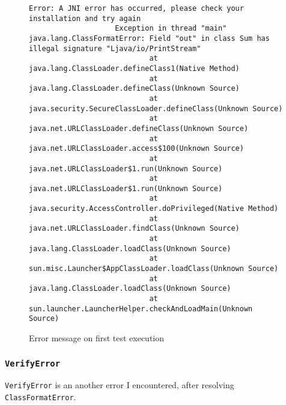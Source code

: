 \documentclass[a4paper, 12pt]{article}
\begin{document}
            \begin{figure}[H]
                \begin{lstlisting}[gobble=20]
                    Error: A JNI error has occurred, please check your installation and try again
                    Exception in thread "main" java.lang.ClassFormatError: Field "out" in class Sum has illegal signature "Ljava/io/PrintStream"
                            at java.lang.ClassLoader.defineClass1(Native Method)
                            at java.lang.ClassLoader.defineClass(Unknown Source)
                            at java.security.SecureClassLoader.defineClass(Unknown Source)
                            at java.net.URLClassLoader.defineClass(Unknown Source)
                            at java.net.URLClassLoader.access$100(Unknown Source)
                            at java.net.URLClassLoader$1.run(Unknown Source)
                            at java.net.URLClassLoader$1.run(Unknown Source)
                            at java.security.AccessController.doPrivileged(Native Method)
                            at java.net.URLClassLoader.findClass(Unknown Source)
                            at java.lang.ClassLoader.loadClass(Unknown Source)
                            at sun.misc.Launcher$AppClassLoader.loadClass(Unknown Source)
                            at java.lang.ClassLoader.loadClass(Unknown Source)
                            at sun.launcher.LauncherHelper.checkAndLoadMain(Unknown Source)
                \end{lstlisting}
        
                \centering        
                \caption{Error message on first test execution}
            \end{figure}
    
            \subsubsection{\texttt{VerifyError}}
            \texttt{VerifyError} is an another error I encountered, after resolving \texttt{ClassFormatError}.
    
\end{document}
